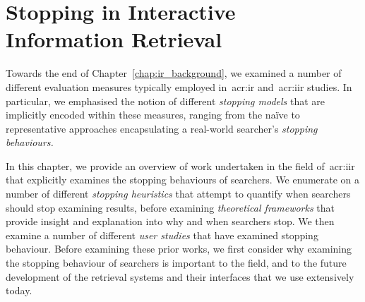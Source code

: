 
\chapter[A Background of Stopping in IIR]{Stopping in Interactive\\Information Retrieval}\label{chap:stopping_background}
Towards the end of Chapter~\ref{chap:ir_background}, we examined a number of different evaluation measures typically employed in~\gls{acr:ir} and~\gls{acr:iir} studies. In particular, we emphasised the notion of different \emph{stopping models} that are implicitly encoded within these measures, ranging from the na\"{i}ve to representative approaches encapsulating a real-world searcher's \emph{stopping behaviours.}

\begin{figure}[h]
    \centering
    \vspace{4mm}
    \label{fig:stopsign}
    \vspace{-5mm}
\end{figure}

In this chapter, we provide an overview of work undertaken in the field of~\gls{acr:iir} that explicitly examines the stopping behaviours of searchers. We enumerate on a number of different \emph{stopping heuristics} that attempt to quantify when searchers should stop examining results, before examining \emph{theoretical frameworks} that provide insight and explanation into why and when searchers stop. We then examine a number of different \emph{user studies} that have examined stopping behaviour. Before examining these prior works, we first consider why examining the stopping behaviour of searchers is important to the field, and to the future development of the retrieval systems and their interfaces that we use extensively today.

